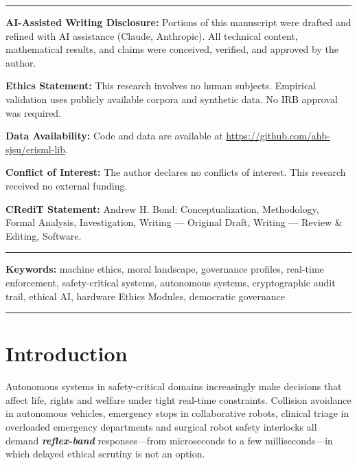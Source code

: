 \documentclass[11pt]{article}
\begin{document}
\begin{titlepage}
\begin{abstract}
Conceptually, DEME~2.0 can be viewed as a \textbf{computational realization of the ``moral landscape''} proposed in moral philosophy: moral peaks and valleys are instantiated as coordinates in a high-dimensional vector space, and governance profiles become algorithms for moving through that space. By bridging moral philosophy, formal methods and embedded systems engineering, DEME~2.0 provides a foundation for \textbf{certifiable, democratically governed autonomy} in contested moral terrain.
\end{abstract}

\vfill

\noindent\rule{\linewidth}{0.4pt}
\small
\noindent\textbf{AI-Assisted Writing Disclosure:} Portions of this manuscript were drafted and refined with AI assistance (Claude, Anthropic). All technical content, mathematical results, and claims were conceived, verified, and approved by the author.

\noindent\textbf{Ethics Statement:} This research involves no human subjects. Empirical validation uses publicly available corpora and synthetic data. No IRB approval was required.

\noindent\textbf{Data Availability:} Code and data are available at \url{https://github.com/ahb-sjsu/erisml-lib}.

\noindent\textbf{Conflict of Interest:} The author declares no conflicts of interest. This research received no external funding.

\noindent\textbf{CRediT Statement:} Andrew H. Bond: Conceptualization, Methodology, Formal Analysis, Investigation, Writing --- Original Draft, Writing --- Review \& Editing, Software.
\noindent\rule{\linewidth}{0.4pt}
\normalsize

\end{titlepage}

\noindent\textbf{Keywords:} machine ethics, moral landscape, governance profiles, real-time enforcement, safety-critical systems, autonomous systems, cryptographic audit trail, ethical AI, hardware Ethics Modules, democratic governance

\hrule
\vspace{1em}

\section{Introduction}

Autonomous systems in safety-critical domains increasingly make decisions that affect life, rights and welfare under tight real-time constraints. Collision avoidance in autonomous vehicles, emergency stops in collaborative robots, clinical triage in overloaded emergency departments and surgical robot safety interlocks all demand \textbf{\emph{reflex-band}} responses---from microseconds to a few milliseconds---in which delayed ethical scrutiny is not an option.
\end{document}
